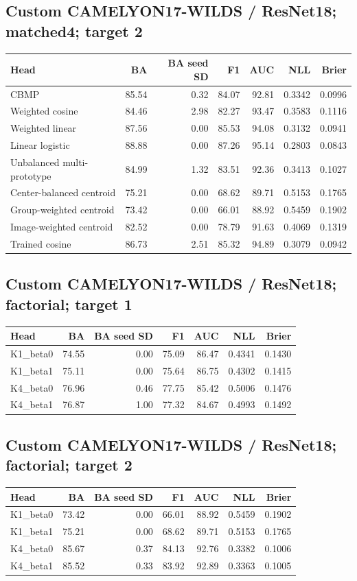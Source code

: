 \subsection*{Custom CAMELYON17-WILDS / ResNet18; matched4; target 2}
\begingroup\small\setlength{\tabcolsep}{3pt}
\begin{longtable}{lrrrrrr}
\toprule Head & BA & BA seed SD & F1 & AUC & NLL & Brier \\
\midrule
CBMP & 85.54 & 0.32 & 84.07 & 92.81 & 0.3342 & 0.0996 \\
Weighted cosine & 84.46 & 2.98 & 82.27 & 93.47 & 0.3583 & 0.1116 \\
Weighted linear & 87.56 & 0.00 & 85.53 & 94.08 & 0.3132 & 0.0941 \\
Linear logistic & 88.88 & 0.00 & 87.26 & 95.14 & 0.2803 & 0.0843 \\
Unbalanced multi-prototype & 84.99 & 1.32 & 83.51 & 92.36 & 0.3413 & 0.1027 \\
Center-balanced centroid & 75.21 & 0.00 & 68.62 & 89.71 & 0.5153 & 0.1765 \\
Group-weighted centroid & 73.42 & 0.00 & 66.01 & 88.92 & 0.5459 & 0.1902 \\
Image-weighted centroid & 82.52 & 0.00 & 78.79 & 91.63 & 0.4069 & 0.1319 \\
Trained cosine & 86.73 & 2.51 & 85.32 & 94.89 & 0.3079 & 0.0942 \\
\bottomrule
\end{longtable}
\endgroup
\subsection*{Custom CAMELYON17-WILDS / ResNet18; factorial; target 1}
\begingroup\small\setlength{\tabcolsep}{3pt}
\begin{longtable}{lrrrrrr}
\toprule Head & BA & BA seed SD & F1 & AUC & NLL & Brier \\
\midrule
K1\_beta0 & 74.55 & 0.00 & 75.09 & 86.47 & 0.4341 & 0.1430 \\
K1\_beta1 & 75.11 & 0.00 & 75.64 & 86.75 & 0.4302 & 0.1415 \\
K4\_beta0 & 76.96 & 0.46 & 77.75 & 85.42 & 0.5006 & 0.1476 \\
K4\_beta1 & 76.87 & 1.00 & 77.32 & 84.67 & 0.4993 & 0.1492 \\
\bottomrule
\end{longtable}
\endgroup
\subsection*{Custom CAMELYON17-WILDS / ResNet18; factorial; target 2}
\begingroup\small\setlength{\tabcolsep}{3pt}
\begin{longtable}{lrrrrrr}
\toprule Head & BA & BA seed SD & F1 & AUC & NLL & Brier \\
\midrule
K1\_beta0 & 73.42 & 0.00 & 66.01 & 88.92 & 0.5459 & 0.1902 \\
K1\_beta1 & 75.21 & 0.00 & 68.62 & 89.71 & 0.5153 & 0.1765 \\
K4\_beta0 & 85.67 & 0.37 & 84.13 & 92.76 & 0.3382 & 0.1006 \\
K4\_beta1 & 85.52 & 0.33 & 83.92 & 92.89 & 0.3363 & 0.1005 \\
\bottomrule
\end{longtable}
\endgroup
